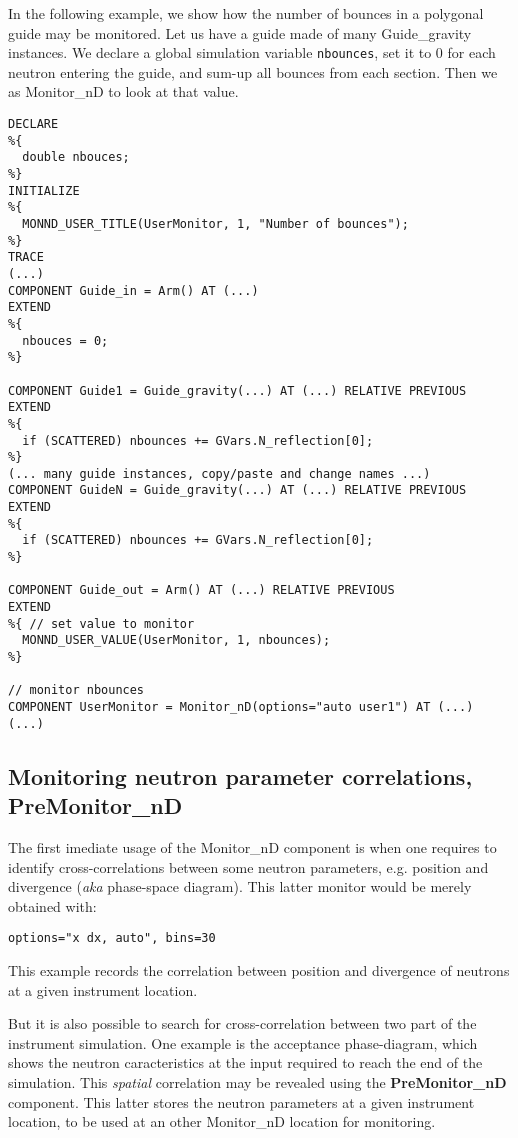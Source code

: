 In the following example, we show how the number of bounces in a polygonal guide may be monitored. Let us have a guide made of many Guide\_gravity instances. We declare a global simulation variable \verb+nbounces+, set it to 0 for each neutron entering the guide, and sum-up all bounces from each section. Then we as Monitor\_nD to look at that value.
\begin{verbatim}
DECLARE
%{
  double nbouces;
%}
INITIALIZE
%{
  MONND_USER_TITLE(UserMonitor, 1, "Number of bounces");
%}
TRACE
(...)
COMPONENT Guide_in = Arm() AT (...)
EXTEND
%{
  nbouces = 0;
%}

COMPONENT Guide1 = Guide_gravity(...) AT (...) RELATIVE PREVIOUS
EXTEND
%{
  if (SCATTERED) nbounces += GVars.N_reflection[0];
%}
(... many guide instances, copy/paste and change names ...)
COMPONENT GuideN = Guide_gravity(...) AT (...) RELATIVE PREVIOUS
EXTEND
%{
  if (SCATTERED) nbounces += GVars.N_reflection[0];
%}

COMPONENT Guide_out = Arm() AT (...) RELATIVE PREVIOUS
EXTEND
%{ // set value to monitor
  MONND_USER_VALUE(UserMonitor, 1, nbounces);
%}

// monitor nbounces
COMPONENT UserMonitor = Monitor_nD(options="auto user1") AT (...)
(...)
\end{verbatim}

\subsection{Monitoring neutron parameter correlations, PreMonitor\_nD}

The first imediate usage of the Monitor\_nD component is when one requires to identify cross-correlations between some neutron parameters, e.g. position and divergence ({\it aka} phase-space diagram). This latter monitor would be merely obtained with:
\begin{verbatim}
options="x dx, auto", bins=30
\end{verbatim}
This example records the correlation between position and divergence of neutrons at a given instrument location.


But it is also possible to search for cross-correlation between two part of the instrument simulation. One example is the acceptance phase-diagram, which shows the neutron caracteristics at the input required to reach the end of the simulation. This \emph{spatial} correlation may be revealed using the {\bf PreMonitor\_nD} component. This latter stores the neutron parameters at a given instrument location, to be used at an other Monitor\_nD location for monitoring.

